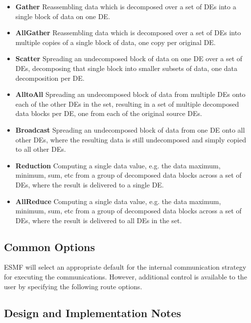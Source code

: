 \begin{itemize}

\item {\bf Gather}
Reassembling data which is decomposed over a set of DEs into a single
block of data on one DE.
\item {\bf AllGather}
Reassembling data which is decomposed over a set of DEs into multiple
copies of a single block of data, one copy per original DE.
\item {\bf Scatter}
Spreading an undecomposed block of data on one DE over a set of DEs,
decomposing that single block into smaller subsets of data, one
data decomposition per DE.
\item {\bf AlltoAll}
Spreading an undecomposed block of data from multiple DEs onto
each of the other DEs in the set, resulting in a set of multiple decomposed 
data blocks per DE, one from each of the original source DEs.
\item {\bf Broadcast}
Spreading an undecomposed block of data from one DE onto all other
DEs, where the resulting data is still undecomposed and simply
copied to all other DEs.
\item {\bf Reduction}
Computing a single data value, e.g. the data maximum, minimum, sum, etc
from a group of decomposed data blocks across a set of DEs, where the
result is delivered to a single DE.
\item {\bf AllReduce}
Computing a single data value, e.g. the data maximum, minimum, sum, etc
from a group of decomposed data blocks across a set of DEs, where the
result is delivered to all DEs in the set.

\end{itemize}

\subsection{Common Options}
\label{sec:routeoptions}

ESMF will select an appropriate default for the
internal communication strategy for executing the communications.  
However, additional control is available
to the user by specifying the following route options.



\subsection{Design and Implementation Notes}

